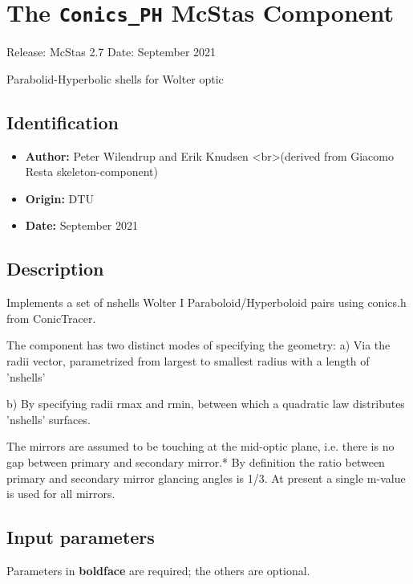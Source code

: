 \section{The \texttt{Conics\_PH} McStas Component}
Release: McStas 2.7
Date: September 2021

Parabolid-Hyperbolic shells for Wolter optic

\subsection*{Identification}
\begin{itemize}
  \item \textbf{Author:} Peter Wilendrup and Erik Knudsen \textless{}br\textgreater{}(derived from Giacomo Resta skeleton-component)
  \item \textbf{Origin:} DTU
  \item \textbf{Date:} September 2021
\end{itemize}

\subsection*{Description}
Implements a set of nshells Wolter I Paraboloid/Hyperboloid pairs using conics.h from ConicTracer.

The component has two distinct modes of specifying the geometry: a) Via the radii vector, parametrized from largest to smallest radius with a length of 'nshells'

b) By specifying radii rmax and rmin, between which a quadratic law distributes 'nshells' surfaces.

The mirrors are assumed to be touching at the mid-optic plane, i.e. there is no gap between primary and secondary mirror.* By definition the ratio between primary and secondary mirror glancing angles is 1/3. At present a single m-value is used for all mirrors.

\subsection*{Input parameters}
Parameters in \textbf{boldface} are required; the others are optional.

